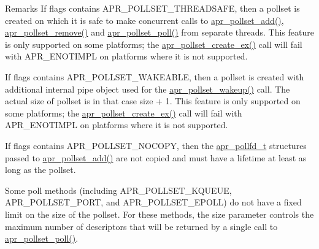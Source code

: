 \begin{DoxyRemark}{Remarks}
If flags contains A\+P\+R\+\_\+\+P\+O\+L\+L\+S\+E\+T\+\_\+\+T\+H\+R\+E\+A\+D\+S\+A\+FE, then a pollset is created on which it is safe to make concurrent calls to \hyperlink{group__apr__poll_ga4ec50bf9a11c6b60927c51b81412f5b9}{apr\+\_\+pollset\+\_\+add()}, \hyperlink{group__apr__poll_ga3c99c06e142d6b6b789eeb6086122e3a}{apr\+\_\+pollset\+\_\+remove()} and \hyperlink{group__apr__poll_ga6b31d7b3a7b2d356370403dd2b79ecf3}{apr\+\_\+pollset\+\_\+poll()} from separate threads. This feature is only supported on some platforms; the \hyperlink{group__apr__poll_ga9448a2d756868aa1c6dbc9726a2e32b5}{apr\+\_\+pollset\+\_\+create\+\_\+ex()} call will fail with A\+P\+R\+\_\+\+E\+N\+O\+T\+I\+M\+PL on platforms where it is not supported. 

If flags contains A\+P\+R\+\_\+\+P\+O\+L\+L\+S\+E\+T\+\_\+\+W\+A\+K\+E\+A\+B\+LE, then a pollset is created with additional internal pipe object used for the \hyperlink{group__apr__poll_gac5e86828143e169e18b2a6eab94be531}{apr\+\_\+pollset\+\_\+wakeup()} call. The actual size of pollset is in that case size + 1. This feature is only supported on some platforms; the \hyperlink{group__apr__poll_ga9448a2d756868aa1c6dbc9726a2e32b5}{apr\+\_\+pollset\+\_\+create\+\_\+ex()} call will fail with A\+P\+R\+\_\+\+E\+N\+O\+T\+I\+M\+PL on platforms where it is not supported. 

If flags contains A\+P\+R\+\_\+\+P\+O\+L\+L\+S\+E\+T\+\_\+\+N\+O\+C\+O\+PY, then the \hyperlink{structapr__pollfd__t}{apr\+\_\+pollfd\+\_\+t} structures passed to \hyperlink{group__apr__poll_ga4ec50bf9a11c6b60927c51b81412f5b9}{apr\+\_\+pollset\+\_\+add()} are not copied and must have a lifetime at least as long as the pollset. 

Some poll methods (including A\+P\+R\+\_\+\+P\+O\+L\+L\+S\+E\+T\+\_\+\+K\+Q\+U\+E\+UE, A\+P\+R\+\_\+\+P\+O\+L\+L\+S\+E\+T\+\_\+\+P\+O\+RT, and A\+P\+R\+\_\+\+P\+O\+L\+L\+S\+E\+T\+\_\+\+E\+P\+O\+LL) do not have a fixed limit on the size of the pollset. For these methods, the size parameter controls the maximum number of descriptors that will be returned by a single call to \hyperlink{group__apr__poll_ga6b31d7b3a7b2d356370403dd2b79ecf3}{apr\+\_\+pollset\+\_\+poll()}. 
\end{DoxyRemark}
